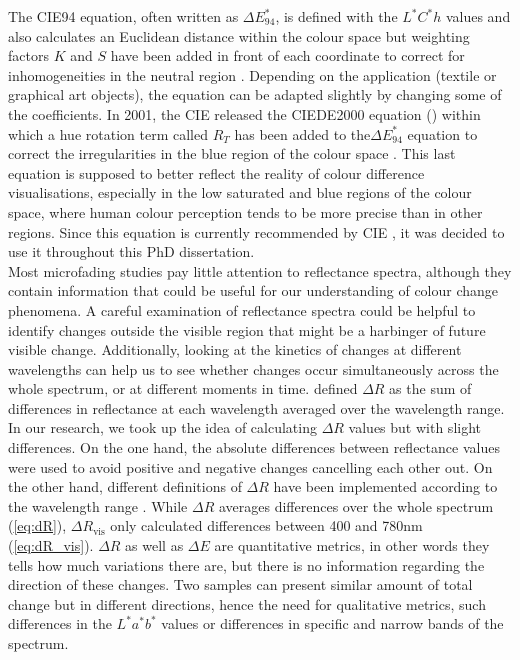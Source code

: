 The CIE94 equation, often written as $\Delta E^*_{94}$, is defined with the $L^*C^*h$ values and also calculates an Euclidean distance within the colour space but weighting factors $K$ and $S$ have been added in front of each coordinate to correct for inhomogeneities in the neutral region \citep{luo_development_2001}. Depending on the application (textile or graphical art objects), the equation can be adapted slightly by changing some of the coefficients. In 2001, the \gls{CIE} released the CIEDE2000 equation (\dEOO) within which a hue rotation term called $R_T$ has been added to the$\Delta E^*_{94}$ equation to correct the irregularities in the blue region of the colour space \citep{sharma_ciede2000_2005, cie_technical_committee_1-47_improvement_2001}. This last equation is supposed to better reflect the reality of colour difference visualisations, especially in the low saturated and blue regions of the colour space, where human colour perception tends to be more precise than in other regions. Since this equation is currently recommended by \gls{CIE} \citep{cie_technical_committee_1-55_recommended_2016}, it was decided to use it throughout this PhD dissertation.\\

Most microfading studies pay little attention to reflectance spectra, although they contain information that could be useful for our understanding of colour change phenomena. A careful examination of reflectance spectra could be helpful to identify changes outside the visible region that might be a harbinger of future visible change. Additionally, looking at the kinetics of changes at different wavelengths can help us to see whether changes occur simultaneously across the whole spectrum, or at different moments in time. \citet[p.2]{liang_development_2011} defined $\Delta R$ as the sum of differences in reflectance at each wavelength averaged over the wavelength range. In our research, we took up the idea of calculating $\Delta R$ values but with slight differences. On the one hand, the absolute differences between reflectance values were used to avoid positive and negative changes cancelling each other out. On the other hand, different definitions of $\Delta R$ have been implemented according to the wavelength range \citep{american_national_standards_institute_aimm_1996}. While $\Delta R$ averages differences over the whole spectrum (\ref{eq:dR}), $\Delta R_{\textrm{vis}}$ only calculated differences between 400 and 780nm (\ref{eq:dR_vis}). $\Delta R$ as well as $\Delta E$ are quantitative metrics, in other words they tells how much variations there are, but there is no information regarding the direction of these changes. Two samples can present similar amount of total change but in different directions, hence the need for qualitative metrics, such differences in the $L^*a^*b^*$ values or differences in specific and narrow bands of the spectrum.


